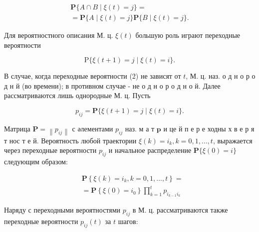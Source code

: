 \documentclass[10pt]{article}
\begin{document}
\[

\begin{gathered}

\mathbf{P}\{A \cap B \mid \xi(t)=j\}= \\

=\mathbf{P}\{A \mid \xi(t)=j\} \mathbf{P}\{B \mid \xi(t)=j\} .

\end{gathered}

\]



Для вероятностного описания М. ц. $\xi(t)$ большую роль играют переходные вероятности



\[

\mathrm{P}\{\xi(t+1)=j \mid \xi(t)=i\} .

\]



В случае, когда переходные вероятности (2) не зависят от $t$, М. ц. наз. о д н о р о д н й (во времени); в противном случае - не о д н о р о д н о й. Далее рассматриваются лишь однородные М. ц. Пусть



\[

p_{i j}=\mathbf{P}\{\xi(t+1)=j \mid \xi(t)=i\} .

\]



Матрица $\mathbf{P}=\left\|p_{i j}\right\|$ с әлементами $p_{i j}$ наз. м а т $\mathbf{p}$ и це й п е р е ходны х в е р я т нос т е й. Вероятность любой траектории $\xi(k)=i_{k}, k=0,1, \ldots, t$, выражается через переходные вероятности $p_{i j}$ и начальное распределение $\mathbf{P}\{\xi(0)=i\}$ следующим образом:



\[

\begin{aligned}

& \mathbf{P}\left\{\xi(k)=i_{k}, k=0,1, \ldots, t\right\}= \\

& =\mathbf{P}\left\{\xi(0)=i_{0}\right\} \prod_{k=1}^{t} p_{i_{k-1} i_{k}}

\end{aligned}

\]



Наряду с переходными вероятностями $p_{i j}$ в М. ц. рассматриваются также переходные вероятности $p_{i j}(t)$ за $t$ шагов:
\end{document}
